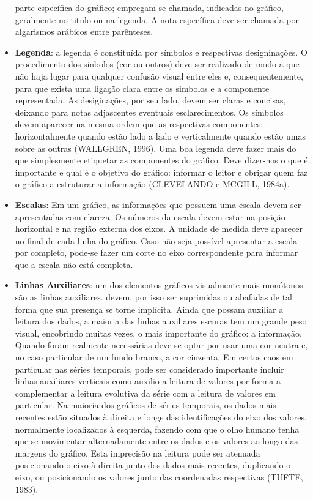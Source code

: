 \begin{itemize}
parte específica do gráfico; empregam-se chamada, indicadas no
gráfico, geralmente no titulo ou na legenda. A nota específica
deve ser chamada por algarismos arábicos entre parênteses.
\item \textbf{Legenda}: a legenda é constituída por símbolos e respectivas designinações. O procedimento dos sinbolos (cor ou outros) deve ser realizado de modo a que não haja lugar para qualquer confusão visual entre eles e, consequentemente, para que exista uma ligação clara entre os simbolos e a componente representada. As desiginações, por seu lado, devem ser claras e concisas, deixando para notas adjascentes eventuais esclarecimentos. Os símbolos devem aparecer na mesma ordem que as respectivas componentes: horizontalmente quando estão lado a lado e verticalmente quando estão umas sobre as outras (WALLGREN, 1996). Uma boa legenda deve fazer mais do que simplesmente etiquetar as componentes do gráfico. Deve dizer-nos o que é importante e qual é o objetivo do gráfico:   
informar o leitor e obrigar quem faz o gráfico a estruturar a informação (CLEVELANDO e MCGILL, 1984a).\vskip0.3cm

\item \textbf{Escalas}: Em um gráfico, as informações que possuem uma escala devem ser apresentadas com clareza. Os números da escala devem estar na posição horizontal e na região
externa dos eixos. A unidade de medida deve aparecer no final de cada linha do gráfico. Caso não seja possível apresentar a escala por completo, pode-se fazer um corte no eixo correspondente para informar que a escala não está completa.

\item \textbf{Linhas Auxiliares}: um dos elementos gráficos visualmente mais monótonos são as linhas auxiliares. devem, por isso ser suprimidas ou abafadas de tal forma que sua presença se torne implícita. Ainda que possam auxiliar a leitura dos dados, a maioria das linhas auxiliares escuras tem um grande peso visual, encobrindo muitas vezes, o mais importante do gráfico: a informação. Quando foram realmente necessárias deve-se optar por usar uma cor neutra e, no caso particular de um fundo branco, a cor cinzenta. Em certos caos em particular nas séries temporais, pode ser considerado importante incluir linhas auxiliares verticais como auxilio a leitura de valores por forma a complementar a leitura evolutiva da série com a leitura de valores em particular. Na maioria dos gráficos de séries temporais, os dados mais recentes estão situados à direita e longe das identificações do eixo dos valores, normalmente localizados à esquerda, fazendo com que o olho humano tenha que se movimentar alternadamente entre os dados e os valores ao longo das margens do gráfico. Esta imprecisão na leitura pode ser atenuada posicionando o eixo à direita junto dos dados mais recentes, duplicando o eixo, ou posicionando os valores junto das coordenadas respectivas (TUFTE, 1983).\vskip0.3cm


\end{itemize}
